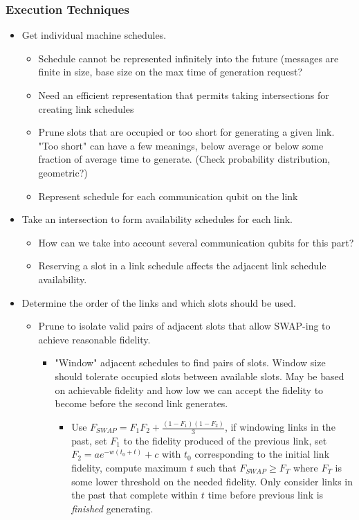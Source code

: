 \documentclass{article}
\begin{document}
\subsubsection{Execution Techniques}
\begin{itemize}
    \item Get individual machine schedules.
    \begin{itemize}
        \item Schedule cannot be represented infinitely into the future (messages are finite in size, base size on the max time of generation request?
        \item Need an efficient representation that permits taking intersections for creating link schedules
        \item Prune slots that are occupied or too short for generating a given link.  "Too short" can have a few meanings, below average or below some fraction of average time to generate. (Check probability distribution, geometric?)
        \item Represent schedule for each communication qubit on the link
    \end{itemize}
    \item Take an intersection to form availability schedules for each link.
    \begin{itemize}
        \item How can we take into account several communication qubits for this part?
        \item Reserving a slot in a link schedule affects the adjacent link schedule availability.
    \end{itemize}
    \item Determine the order of the links and which slots should be used.
    \begin{itemize}
        \item Prune to isolate valid pairs of adjacent slots that allow SWAP-ing to achieve reasonable fidelity.
        \begin{itemize}
            \item "Window" adjacent schedules to find pairs of slots.  Window size should tolerate occupied slots between available slots.  May be based on achievable fidelity and how low we can accept the fidelity to become before the second link generates.
            \begin{itemize}
                \item Use $F_{SWAP}=F_1 F_2 + \frac{(1-F_1)(1-F_2)}{3}$, if windowing links in the past, set $F_1$ to the fidelity produced of the previous link, set $F_2=ae^{-w(t_0+t)} + c$ with $t_0$ corresponding to the initial link fidelity, compute maximum $t$ such that $F_{SWAP} \geq F_T$ where $F_T$ is some lower threshold on the needed fidelity.  Only consider links in the past that complete within $t$ time before previous link is \emph{finished} generating.

\end{itemize}
\end{itemize}
\end{itemize}
\end{itemize}
\end{document}
